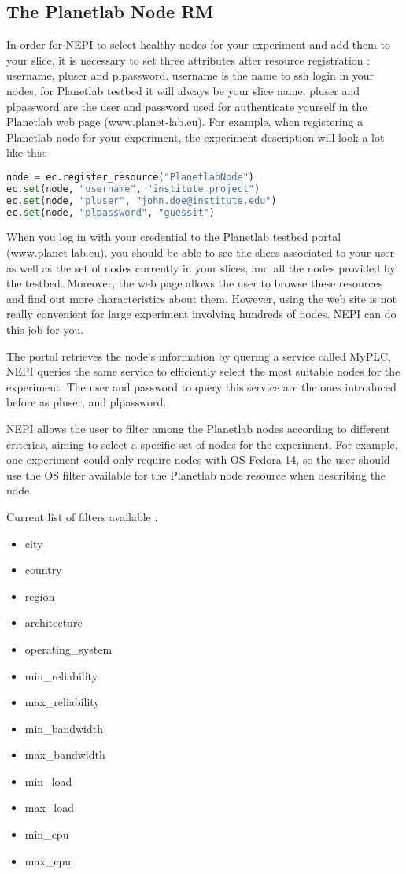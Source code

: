 \subsection{The Planetlab Node RM}

In order for NEPI to select healthy nodes for your experiment and add them to your slice, it is necessary to set three attributes after resource registration : username, pluser and plpassword. username is the name to ssh login in your nodes, for Planetlab testbed it will always be your slice
name. pluser and plpassword are the user and password used for authenticate yourself in the Planetlab web page (www.planet-lab.eu). For example, when registering a Planetlab node for your experiment, the
experiment description will look a lot like this:
\begin{lstlisting}[language=Python]
node = ec.register_resource("PlanetlabNode")
ec.set(node, "username", "institute_project")
ec.set(node, "pluser", "​​john.doe@institute.edu")
ec.set(node, "plpassword", "guessit")
\end{lstlisting}
When you log in with your credential to the Planetlab testbed portal (www.planet-lab.eu), you should be able to see the slices associated to your user as well as the set of nodes currently in your slices, and all the nodes provided by the testbed. Moreover, the web page allows the user to browse these resources and find out more characteristics about them. However, using the web site is not really convenient for large experiment involving hundreds of nodes. NEPI can do this job for you.

The portal retrieves the node's information by quering a service called MyPLC, NEPI queries the same service to efficiently select the most suitable nodes for the experiment. The user and password to query this service are the ones introduced before as pluser, and plpassword.

NEPI allows the user to filter among the Planetlab nodes according to different criterias, aiming to select a specific set of nodes for the experiment. For example, one experiment could only require nodes with OS Fedora 14, so the user should use the OS filter available for the Planetlab node resource when describing the node.

Current list of filters available :
\begin{itemize}
  \item city
  \item country
  \item region
  \item architecture
  \item operating\_system
  \item min\_reliability
  \item max\_reliability
  \item min\_bandwidth
  \item max\_bandwidth
  \item min\_load
  \item max\_load
  \item min\_cpu
  \item max\_cpu
\end{itemize}

